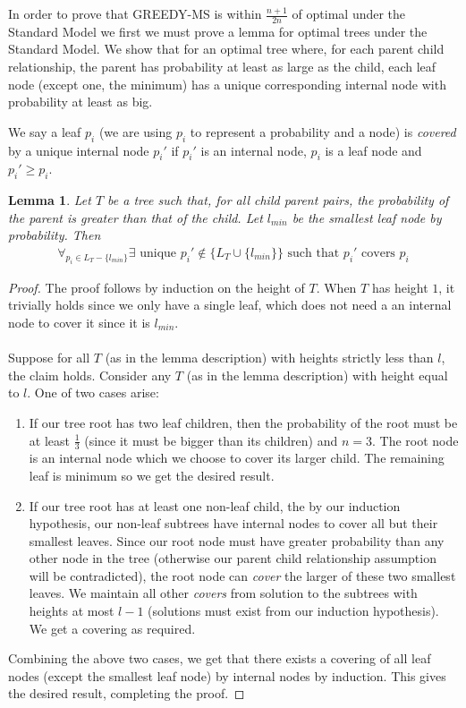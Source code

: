 \documentclass[letterpaper,12pt,titlepage,oneside,final]{book}
\theoremstyle{plain}
\newtheorem{lem}[thm]{Lemma}
\begin{document}
In order to prove that GREEDY-MS is within $\frac{n+1}{2n}$ of optimal under the Standard Model  we first we must prove a lemma for optimal trees under the Standard Model. We show that for an optimal tree where, for each parent child relationship, the parent has probability at least as large as the child, each leaf node (except one, the minimum) has a unique corresponding internal node with probability at least as big.

We say a leaf $p_i$ (we are using $p_i$ to represent a probability and a node) is \textit{covered} by a unique internal node $p_i'$ if $p_i'$ is an internal node, $p_i$ is a leaf node and $p_i' \geq p_i$.

\begin{lem}\label{leavesCovered}
Let $T$ be a tree such that, for all child parent pairs, the probability of the parent is greater than that of the child. Let $l_{min}$ be the smallest leaf node by probability. Then
\begin{align*}
\forall_{p_i \in L_T-\{l_{min}\}} \exists \text{ unique } p_i' \notin \{L_T \cup \{l_{min}\}\} \text{ such that } p_i' \text{ covers } p_i
\end{align*}
\end{lem}
\begin{proof}
The proof follows by induction on the height of $T$. When $T$ has height $1$, it trivially holds since we only have a single leaf, which does not need a an internal node to cover it since it is $l_{min}$. \\~\\ 
Suppose for all $T$ (as in the lemma description) with heights strictly less than $l$, the claim holds. Consider any $T$ (as in the lemma description) with height equal to $l$. One of two cases arise:

\begin{enumerate}
\item If our tree root has two leaf children, then the probability of the root must be at least $\frac{1}{3}$ (since it must be bigger than its children) and $n=3$. The root node is an internal node which we choose to cover its larger child. The remaining leaf is minimum so we get the desired result.

\item If our tree root has at least one non-leaf child, the by our induction hypothesis, our non-leaf subtrees have internal nodes to cover all but their smallest leaves. Since our root node must have greater probability than any other node in the tree (otherwise our parent child relationship assumption will be contradicted), the root node can \textit{cover} the larger of these two smallest leaves. We maintain all other \textit{covers} from solution to the subtrees with heights at most $l-1$ (solutions must exist from our induction hypothesis). We get a covering as required.
\end{enumerate}

\noindent Combining the above two cases, we get that there exists a covering of all leaf nodes (except the smallest leaf node) by internal nodes by induction. This gives the desired result, completing the proof.

\end{proof}
\end{document}
